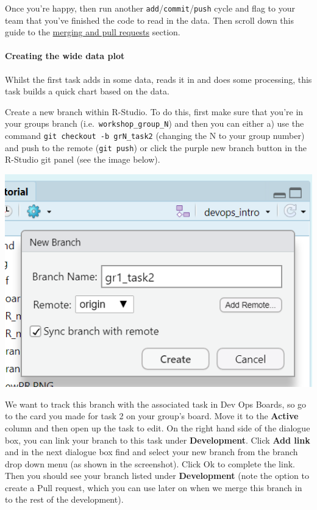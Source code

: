 \documentclass[
  12pt,
]{article}
\begin{document}
Once you're happy, then run another
\texttt{add}/\texttt{commit}/\texttt{push} cycle and flag to your team
that you've finished the code to read in the data. Then scroll down this
guide to the \protect\hyperlink{merging-and-pull-requests}{merging and
pull requests} section.

\hypertarget{creating-the-wide-data-plot}{%
\paragraph{Creating the wide data
plot}\label{creating-the-wide-data-plot}}

Whilst the first task adds in some data, reads it in and does some
processing, this task builds a quick chart based on the data.

Create a new branch within R-Studio. To do this, first make sure that
you're in your groups branch (i.e.~\texttt{workshop\_group\_N}) and then
you can either a) use the command \texttt{git\ checkout\ -b\ grN\_task2}
(changing the N to your group number) and push to the remote
(\texttt{git\ push}) or click the purple new branch button in the
R-Studio git panel (see the image below).

\begin{center}\includegraphics[width=0.92\linewidth]{images/DevOpsdemo/DevOps_RStudio_newbranch} \end{center}

We want to track this branch with the associated task in Dev Ops Boards,
so go to the card you made for task 2 on your group's board. Move it to
the \textbf{Active} column and then open up the task to edit. On the
right hand side of the dialogue box, you can link your branch to this
task under \textbf{Development}. Click \textbf{Add link} and in the next
dialogue box find and select your new branch from the branch drop down
menu (as shown in the screenshot). Click Ok to complete the link. Then
you should see your branch listed under \textbf{Development} (note the
option to create a Pull request, which you can use later on when we
merge this branch in to the rest of the development).
\end{document}

